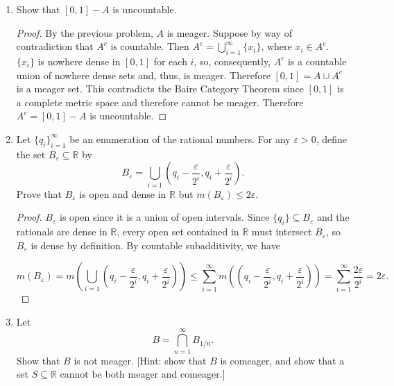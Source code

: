 \documentclass[11pt,oneside,english]{amsart}
\theoremstyle{definition}
\newcommand{\lom}[2]{\lim_{{#1}\rightarrow{#2}}}
\newcommand{\ve}{\varepsilon}
\newcommand{\MB}[1]{\mathbb{#1}}
\begin{document}
\begin{enumerate}
\begin{proof}
First, note that $K_{1/n}\subseteq K_{1/(n+1)}$. This is because each interval in the iteration in the construction of $K_{1/n}$ is contained in an interval in the corresponding iteration in the construction $K_{1/(n+1)}$. Consequently, by continuity from below,
\[
m(A)=m\left(\bigcup_{n=3}^\infty K_{1/n}\right)=\lom{n}{\infty}m(K_{1/n})=\lom{n}{\infty}\left(1-\frac{\frac{1}{n}}{1-\frac{2}{n}}\right)=1.
\]
By Problem 4, each $K_{1/n}$ is nowhere dense, so $A$ is a countable union of nowhere dense sets and thus is meager by definition.
\end{proof}

\item Show that $[0,1]-A$ is uncountable.

\begin{proof}
By the previous problem, $A$ is meager. Suppose by way of contradiction that $A^c$ is countable. Then $A^c=\bigcup_{i=1}^\infty\{x_i\}$, where $x_i\in A^c$. $\{x_i\}$ is nowhere dense in $[0,1]$ for each $i$, so, consequently, $A^c$ is a countable union of nowhere dense sets and, thus, is meager. Therefore $[0,1]=A\cup A^c$ is a meager set. This contradicts the Baire Category Theorem since $[0,1]$ is a complete metric space and therefore cannot be meager. Therefore $A^c=[0,1]-A$ is uncountable.
\end{proof}

\item Let $\{q_i\}_{i=1}^\infty $ be an enumeration of the rational numbers.  For any $\ve > 0$, define the set $B_\ve \subseteq \MB{R}$ by
\[         B_\ve = \bigcup_{i= 1}  \left(q_i - \frac{\ve}{2^i}, q_i + \frac{\ve}{2^i}\right) .\]
Prove that $B_\ve$ is open and dense in $\MB{R}$ but $m(B_\ve) \leq 2 \ve$.

\begin{proof}
$B_\ve$ is open since it is a union of open intervals. Since $\{q_i\}\subseteq B_\ve$ and the rationals are dense in $\MB{R}$, every open set contained in $\MB{R}$ must intersect $B_\ve$, so $B_\ve$ is dense by definition. By countable subadditivity, we have

\[
m(B_\ve)=m\left(\bigcup_{i= 1}  \left(q_i - \frac{\ve}{2^i}, q_i + \frac{\ve}{2^i}\right)\right)\leq\sum_{i=1}^\infty m\left(\left(q_i - \frac{\ve}{2^i}, q_i + \frac{\ve}{2^i}\right)\right)=\sum_{i=1}^\infty \frac{2\ve}{2^i}=2\ve.
\]
\end{proof}

\pagebreak

\item  Let 
\[        B = \bigcap_{n = 1}^\infty B_{1/n} .\]
Show that $B$ is not meager. [Hint: show that $B$ is comeager, and show that a set $S \subseteq \MB{R}$ cannot be both meager and comeager.]


\end{enumerate}
\end{document}
